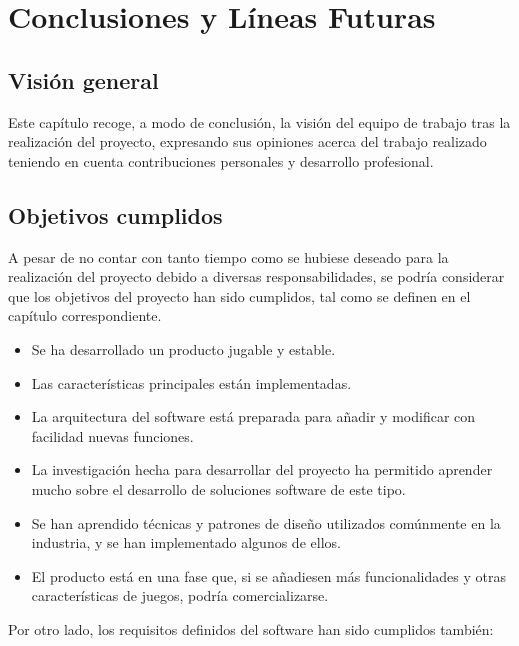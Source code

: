 \chapter{Conclusiones y Líneas Futuras}

\section{Visión general}

	Este capítulo recoge, a modo de conclusión, la visión del equipo de trabajo tras la realización del proyecto, expresando sus opiniones acerca del trabajo realizado teniendo en cuenta contribuciones personales y desarrollo profesional.

\section{Objetivos cumplidos}

	A pesar de no contar con tanto tiempo como se hubiese deseado para la realización del proyecto debido a diversas responsabilidades, se podría considerar que los objetivos del proyecto han sido cumplidos, tal como se definen en el capítulo correspondiente.

	\begin{itemize}

		\item Se ha desarrollado un producto jugable y estable.

		\item Las características principales están implementadas.

		\item La arquitectura del software está preparada para añadir y modificar con facilidad nuevas funciones.

		\item La investigación hecha para desarrollar del proyecto ha permitido aprender mucho sobre el desarrollo de soluciones software de este tipo.

		\item Se han aprendido técnicas y patrones de diseño utilizados comúnmente en la industria, y se han implementado algunos de ellos.

		\item El producto está en una fase que, si se añadiesen más funcionalidades y otras características de juegos, podría comercializarse.

	\end{itemize}

	Por otro lado, los requisitos definidos del software han sido cumplidos también:

